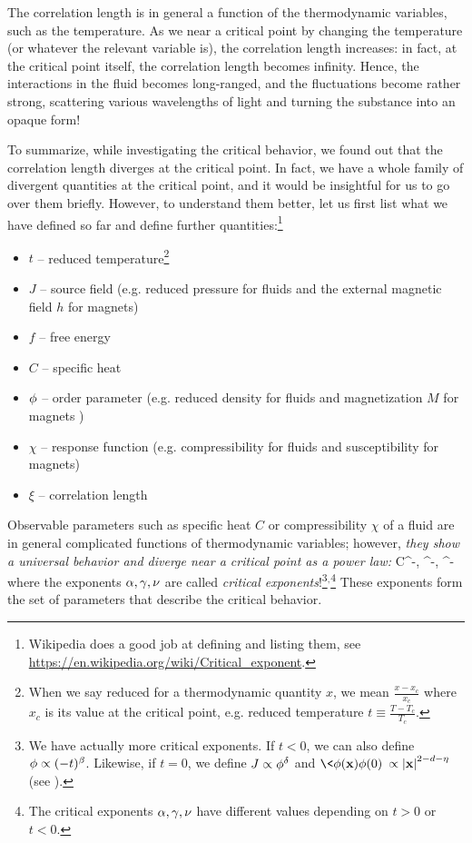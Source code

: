 The correlation length is in general a function of the thermodynamic variables, such as the temperature. As we near a critical point by changing the temperature (or whatever the relevant variable is), the correlation length increases: in fact, at the critical point itself, the correlation length becomes infinity. Hence, the interactions in the fluid becomes long-ranged, and the fluctuations become rather strong, scattering various wavelengths of light and turning the substance into an opaque form!

To summarize, while investigating the critical behavior, we found out that the correlation length diverges at the critical point. In fact, we have a whole family of divergent quantities at the critical point, and it would be insightful for us to go over them briefly. However, to understand them better, let us first list what we have defined so far and define further quantities:\footnote{Wikipedia does a good job at defining and listing them, see \hyperref{https://en.wikipedia.org/wiki/Critical\_exponent}{}{}{https://en.wikipedia.org/wiki/Critical\_exponent}.}
\begin{multicols}{2}
	\begin{itemize}
		\item $t$ -- reduced temperature\footnote{When we say reduced for a thermodynamic quantity $x$, we mean $\frac{x-x_c}{x_c}$ where $x_c$ is its value at the critical point, e.g. reduced temperature $t\equiv\frac{T-T_c}{T_c}$.}
		\item $J$ -- source field (e.g. reduced pressure for fluids and the external magnetic field $h$ for magnets)
		\item $f$ -- free energy
		\item $C$ -- specific heat
		\item $\phi$ -- order parameter (e.g. reduced density for fluids and magnetization $M$ for magnets )
		\item $\chi$ -- response function (e.g. compressibility for fluids and susceptibility for magnets)
		\item $\xi$ -- correlation length
	\end{itemize}
\end{multicols}

Observable parameters such as specific heat $C$ or compressibility $\chi$ of a fluid are in general complicated functions of thermodynamic variables; however, \emph{they show a universal behavior and diverge near a critical point as a power law:}
\be 
C\propto{}^{-\a}\;,\quad 
\chi\propto{}^{-\g}\;,\quad 
\xi\propto{}^{-\nu}\; 
\ee 
where the exponents $\alpha,\gamma,\nu$ are called \emph{critical exponents}!\footnote{
	We have actually more critical exponents. If $t<0$, we can also define $\phi\propto(-t)^{\beta}$. Likewise, if $t=0$, we define $J\propto\phi^{\delta}$ and $\<\f(\bx)\f(0)\>\propto\abs{\bx}^{2-d-\eta}$ (see ).
}$^{,}$\footnote{The critical exponents $\alpha,\gamma,\nu$ have different values depending on $t>0$ or $t<0$.} These exponents form the set of parameters that describe the critical behavior.

